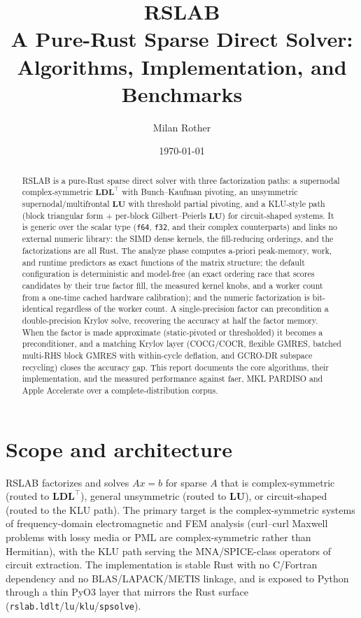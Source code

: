 \documentclass[11pt,a4paper]{article}
\title{\textbf{\textcolor{accent}{RSLAB}}\\[2pt]
\large A Pure-Rust Sparse Direct Solver: Algorithms, Implementation, and Benchmarks}
\author{Milan Rother}
\date{\today}
\newcommand{\rT}{\textsf{RSLAB}}
\newcommand{\code}[1]{\texttt{\small #1}}
\newcommand{\LDLt}{\mathbf{L}\mathbf{D}\mathbf{L}^{\!\top}}
\newcommand{\LU}{\mathbf{L}\mathbf{U}}
\begin{document}
\maketitle

\begin{abstract}
\noindent\rT{} is a pure-Rust sparse direct solver with three factorization paths: a
supernodal complex-symmetric $\LDLt$ with Bunch--Kaufman pivoting, an unsymmetric
supernodal/multifrontal $\LU$ with threshold partial pivoting, and a KLU-style path
(block triangular form + per-block Gilbert--Peierls $\LU$) for circuit-shaped systems.
It is generic over the scalar type (\code{f64}, \code{f32}, and their complex
counterparts) and links no external numeric library: the SIMD dense kernels, the
fill-reducing orderings, and the factorizations are all Rust. The analyze phase computes
a-priori peak-memory, work, and runtime predictors as exact functions of the matrix
structure; the default configuration is deterministic and model-free (an exact ordering
race that scores candidates by their true factor fill, the measured kernel knobs, and a
worker count from a one-time cached hardware calibration); and the numeric factorization
is bit-identical regardless of the worker count. A single-precision factor
can precondition a double-precision Krylov solve, recovering the accuracy at half the
factor memory. When the factor is made approximate (static-pivoted or
thresholded) it becomes a preconditioner, and a matching Krylov layer (COCG/COCR,
flexible GMRES, batched multi-RHS block GMRES with within-cycle deflation, and GCRO-DR
subspace recycling) closes the accuracy gap. This report documents the core algorithms,
their implementation, and the measured performance against \textsf{faer}, MKL PARDISO and
Apple Accelerate over a complete-distribution corpus.
\end{abstract}

\section{Scope and architecture}
\rT{} factorizes and solves $Ax=b$ for sparse $A$ that is complex-symmetric (routed to
$\LDLt$), general unsymmetric (routed to $\LU$), or circuit-shaped (routed to the KLU
path). The primary target is the complex-symmetric systems of frequency-domain
electromagnetic and FEM analysis (curl--curl Maxwell problems with lossy media or PML
are complex-symmetric rather than Hermitian), with the KLU path serving the
MNA/SPICE-class operators of circuit extraction. The implementation is stable Rust with
no C/Fortran dependency and no BLAS/LAPACK/METIS linkage, and is exposed to Python
through a thin PyO3 layer that mirrors the Rust surface
(\code{rslab.ldlt}/\code{lu}/\code{klu}/\code{spsolve}).
\end{document}
